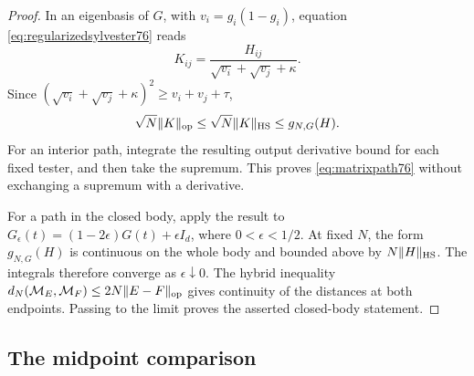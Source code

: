 \begin{proof}
In an eigenbasis of $G$, with $v_i=g_i(1-g_i)$, equation
\eqref{eq:regularizedsylvester76} reads
\[
 K_{ij}=\frac{H_{ij}}{\sqrt{v_i}+\sqrt{v_j}+\kappa}.
\]
Since $(\sqrt{v_i}+\sqrt{v_j}+\kappa)^2\ge v_i+v_j+\tau$,
\begin{equation}\label{eq:regularizedformbound76}
 \sqrt N\|K\|_{\rm op}
 \le\sqrt N\|K\|_{\rm HS}
 \le g_{N,G}(H).
\end{equation}
For an interior path, integrate the resulting output derivative
bound for each fixed tester, and then take the supremum.  This
proves \eqref{eq:matrixpath76} without exchanging a supremum
with a derivative.

For a path in the closed body, apply the result to
$G_\epsilon(t)=(1-2\epsilon)G(t)+\epsilon I_d$, where
$0<\epsilon<1/2$.  At fixed $N$, the form
$g_{N,G}(H)$ is continuous on the whole body and bounded above
by $N\|H\|_{\rm HS}$.  The integrals therefore converge as
$\epsilon\downarrow0$.  The hybrid inequality
$d_N(\mathcal M_E,\mathcal M_F)\le2N\|E-F\|_{\rm op}$
gives continuity of the distances at both endpoints.  Passing to
the limit proves the asserted closed-body statement.
\end{proof}

\subsection{The midpoint comparison}

